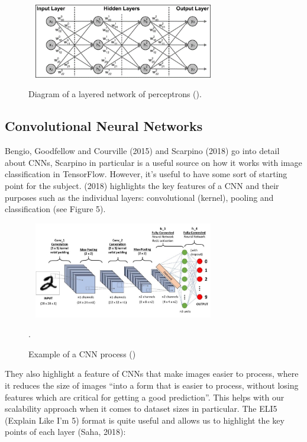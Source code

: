 \documentclass{article}
\begin{document}
\begin{figure}[h]\
    \centering
    \includegraphics[width=0.7\textwidth]{network.png}
    \caption{Diagram of a layered network of perceptrons (\cite{ScarpinoMatthew2018Tfd}).}
\end{figure}

\subsection{Convolutional Neural Networks}

Bengio, Goodfellow and Courville (2015) and Scarpino (2018) go into detail about CNNs, Scarpino in particular is a
useful source on how it works with image classification in TensorFlow. However, it's useful to have 
some sort of starting point for the subject. \citeauthor{saha2018} (2018) highlights the key features of a CNN and their
purposes such as the individual layers: convolutional (kernel),  pooling and classification (see Figure 5).

\begin{figure}[h]\
    \centering
    \includegraphics[width=0.7\textwidth]{saha.jpg}
    \caption{Example of a CNN process (\cite{saha2018})}.
\end{figure}

They also highlight a feature of CNNs that make images easier to process, where it reduces the size of images “into a 
form that is easier to process, without losing features which are critical for getting a good prediction”. This helps 
with our scalability approach when it comes to dataset sizes in particular. The ELI5 (Explain Like I'm 5) format is 
quite useful and allows us to highlight the key points of each layer (Saha, 2018):
\end{document}
